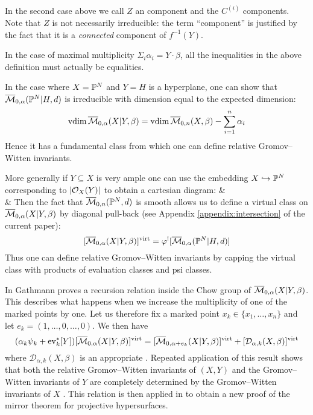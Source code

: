 \begin{remark}In the second case above we call $Z$ an  component and the $C^{(i)}$  components. Note that $Z$ is not necessarily irreducible: the term ``component'' is justified by the fact that it is a \emph{connected} component of $f^{-1}(Y)$. \end{remark}

\begin{remark} In the case of maximal multiplicity $\Sigma_{i} \alpha_i = Y \cdot \beta$, all the inequalities in the above definition must actually be equalities. \end{remark}

In the case where $X=\mathbb P^N$ and $Y=H$ is a hyperplane, one can show that $\overline{\mathcal M}_{0,\alpha}(\mathbb P^N|H,d)$ is irreducible with dimension equal to the expected dimension:
\begin{equation*} \operatorname{vdim} \overline{\mathcal M}_{0,\alpha}(X|Y,\beta) = \operatorname{vdim}{\overline{\mathcal M}_{0,n}(X,\beta)} - \sum_{i=1}^n \alpha_i \end{equation*}
Hence it has a fundamental class from which one can define relative Gromov--Witten invariants.

More generally if $Y \subseteq X$ is very ample one can use the embedding $X \hookrightarrow \mathbb P^N$ corresponding to $|\mathcal{O}_X(Y)|$ to obtain a cartesian diagram:
\bcd
{} \ar[r] \ar[d]  &  \ar[d] \\
 \ar[r,"\varphi"] & 
\ecd
Then the fact that $\overline{\mathcal M}_{0,n}(\mathbb P^N,d)$ is smooth allows us to define a virtual class on $\overline{\mathcal M}_{0,\alpha}(X|Y,\beta)$ by diagonal pull-back (see Appendix \ref{appendix:intersection} of the current paper):
\begin{equation*} [\overline{\mathcal M}_{0,\alpha}(X|Y,\beta)]^{\operatorname{virt}} = \varphi^! [\overline{\mathcal M}_{0,\alpha}(\mathbb P^N|H,d)] \end{equation*}
Thus one can define relative Gromov--Witten invariants by capping the virtual class with products of evaluation classes and psi classes.

In \cite[\S\S 2-4]{Ga} Gathmann proves a recursion relation inside the Chow group of $\overline{\mathcal M}_{0,\alpha}(X|Y,\beta)$. This describes what happens when we increase the multiplicity of one of the marked points by one. Let us therefore fix a marked point $x_k \in \{ x_1, \ldots, x_n \}$ and let $e_k = (1,\ldots,0,\ldots,0)$. We then have
\begin{equation*} (\alpha_k \psi_k + \operatorname{ev}_k^* [Y]) [\overline{\mathcal M}_{0,\alpha}(X|Y,\beta)]^{\operatorname{virt}} = [\overline{\mathcal M}_{0,\alpha+e_k}(X|Y,\beta)]^{\operatorname{virt}} + [\mathcal{D}_{\alpha,k}(X,\beta)]^{\operatorname{virt}} \end{equation*}
where $\mathcal{D}_{\alpha,k}(X,\beta)$ is an appropriate . Repeated application of this result shows that both the relative Gromov--Witten invariants of $(X,Y)$ and the Gromov--Witten invariants of $Y$ are completely determined by the Gromov--Witten invariants of $X$ \cite[Corollary 5.7]{Ga}. This relation is then applied in \cite{Ga-MF} to obtain a new proof of the mirror theorem for projective hypersurfaces.

